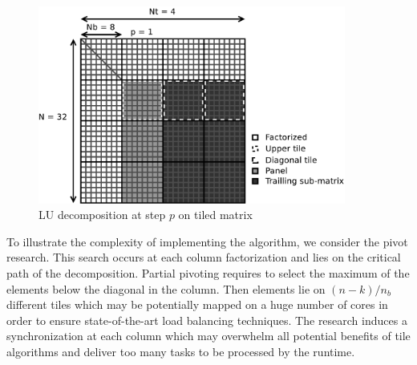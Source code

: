 \begin{figure}[!ht]
\centering
\includegraphics[width=0.9\textwidth]{figures/tiled_matrix.pdf}
\caption{LU decomposition at step $p$ on tiled matrix \label{fig:tiled_matrix}}
\end{figure}

To illustrate the complexity of implementing the algorithm, we consider the pivot research. This search occurs at each column factorization and lies on the critical path of the decomposition. Partial pivoting requires to select the maximum of the elements below the diagonal in the column. Then elements lie on $(n-k)/n_b$ different tiles which may be potentially mapped on a huge number of cores in order to ensure state-of-the-art load balancing techniques. The research induces a synchronization at each column which may overwhelm all potential benefits of tile algorithms and deliver too many tasks to be processed by the runtime.

